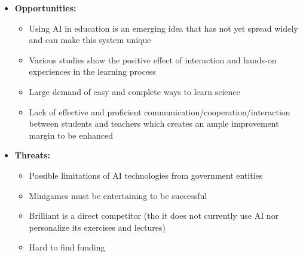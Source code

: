 \begin{itemize}
	\item \textbf{Opportunities:}
		\begin{itemize}
			\item Using AI in education is an emerging idea that has not yet spread widely and can make this system unique
			\item Various studies show the positive effect of interaction and hands-on experiences in the learning process
			\item Large demand of easy and complete ways to learn science
			\item Lack of effective and proficient communication/cooperation/interaction between students and teachers which creates an ample improvement margin to be enhanced
		\end{itemize}
		
	\item \textbf{Threats:}
		\begin{itemize}
			\item Possible limitations of AI technologies from government entities
			\item Minigames must be entertaining to be successful
			\item Brilliant is a direct competitor (tho it does not currently use AI nor personalize its exercises and lectures)
			\item Hard to find funding
		\end{itemize}
\end{itemize}
